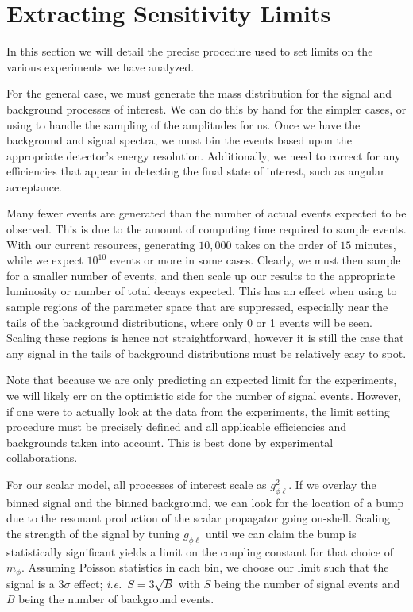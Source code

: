 \section{Extracting Sensitivity Limits}
\label{sec:limit_procedure}
In this section we will detail the precise procedure used to set limits on the various experiments we have analyzed.

For the general case, we must generate the mass distribution for the signal and background processes of interest.
We can do this by hand for the simpler cases, or using \madgraph to handle the sampling of the amplitudes for us.
Once we have the background and signal spectra, we must bin the events based upon the appropriate detector's energy resolution.
Additionally, we need to correct for any efficiencies that appear in detecting the final state of interest, such as angular acceptance.

Many fewer events are generated than the number of actual events expected to be observed.
This is due to the amount of computing time required to sample events.
With our current resources, generating $10,000$ takes on the order of $15$ minutes, while we expect $10^{10}$ events or more in some cases.
Clearly, we must then sample for a smaller number of events, and then scale up our results to the appropriate luminosity or number of total decays expected.
This has an effect when using \madgraph to sample regions of the parameter space that are suppressed, especially near the tails of the background distributions, where only 0 or 1 events will be seen.
Scaling these regions is hence not straightforward, however it is still the case that any signal in the tails of background distributions must be relatively easy to spot.

Note that because we are only predicting an expected limit for the experiments, we will likely err on the optimistic side for the number of signal events.
However, if one were to actually look at the data from the experiments, the limit setting procedure must be precisely defined and all applicable efficiencies and backgrounds taken into account.
This is best done by experimental collaborations.

For our scalar model, all processes of interest scale as $g_{\phi\ell}^2$.
If we overlay the binned signal and the binned background, we can look for the location of a bump due to the resonant production of the scalar propagator going on-shell.
Scaling the strength of the signal by tuning $g_{\phi\ell}$ until we can claim the bump is statistically significant yields a limit on the coupling constant for that choice of $m_\phi$.
Assuming Poisson statistics in each bin, we choose our limit such that the signal is a $3\sigma$ effect; {\em i.e.}\ $S = 3\sqrt{B}$ with $S$ being the number of signal events and $B$ being the number of background events.

